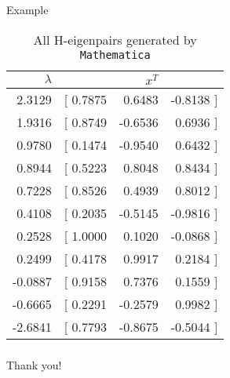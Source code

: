 \documentclass[10pt,compress,t,noamsthm,notheorem,table,handout]{beamer}
\theoremstyle{nonumberbreak}%
\begin{document}
\begin{frame}{Example}

\renewcommand{\arraystretch}{1.15}
\begin{center}
\begin{table}
\caption{All H-eigenpairs generated by \texttt{Mathematica}}
\centering
\begin{tabular}{r|rrr}\toprule
$\lambda$  &  &   $x^T$ & \\\midrule
2.3129  & [ 0.7875&  0.6483& -0.8138 ]\\
1.9316  & [ 0.8749& -0.6536&  0.6936 ]\\
0.9780  & [ 0.1474& -0.9540&  0.6432 ]\\
0.8944  & [ 0.5223&  0.8048&  0.8434 ]\\
0.7228  & [ 0.8526&  0.4939&  0.8012 ]\\
0.4108  & [ 0.2035& -0.5145& -0.9816 ]\\
0.2528  & [ 1.0000&  0.1020& -0.0868 ]\\
0.2499  & [ 0.4178&  0.9917&  0.2184 ]\\
-0.0887 & [ 0.9158&  0.7376&  0.1559 ]\\
-0.6665 & [ 0.2291& -0.2579&  0.9982 ]\\
-2.6841 & [ 0.7793& -0.8675& -0.5044 ]\\
\bottomrule
\end{tabular}
\end{table}
\end{center}
\end{frame}


\begin{frame}[c]
\frametitle{}
  \begin{center}\Huge\color{red}
    Thank you!
  \end{center}
\end{frame}
\end{document}
